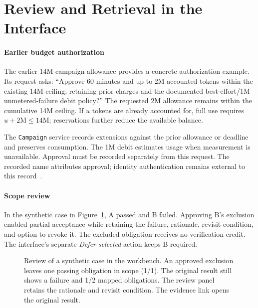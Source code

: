 \section{Review and Retrieval in the Interface}
\label{app:interface-details}
\suppressfloats[t]


\paragraph{Earlier budget authorization}
\label{sec:review-example}
\label{sec:budget-example}
The earlier 14M campaign allowance provides a concrete authorization example. Its request asks: ``Approve 60 minutes and up to 2M accounted tokens within the existing 14M ceiling, retaining prior charges and the documented best-effort/1M unmetered-failure debit policy?'' The requested 2M allowance remains within the cumulative 14M ceiling. If $u$ tokens are already accounted for, full use requires $u+2\mathrm{M}\leq14\mathrm{M}$; reservations further reduce the available balance.

The \texttt{Campaign} service records extensions against the prior allowance or deadline and preserves consumption. The 1M debit estimates usage when measurement is unavailable. Approval must be recorded separately from this request. The recorded name attributes approval; identity authentication remains external to this record~\cite{scpCheckpoint}.

\paragraph{Scope review}
In the synthetic case in Figure~\ref{fig:ui-approval-summary}, A passed and B failed. Approving B's exclusion enabled partial acceptance while retaining the failure, rationale, revisit condition, and option to revoke it. The excluded obligation receives no verification credit. The interface's separate \emph{Defer selected} action keeps B required.

\begin{figure}[!htbp]
\centering

\caption{Review of a synthetic case in the workbench. An approved exclusion leaves one passing obligation in scope (1/1). The original result still shows a failure and 1/2 mapped obligations. The review panel retains the rationale and revisit condition. The evidence link opens the original result.}
\label{fig:ui-approval-summary}
\end{figure}

